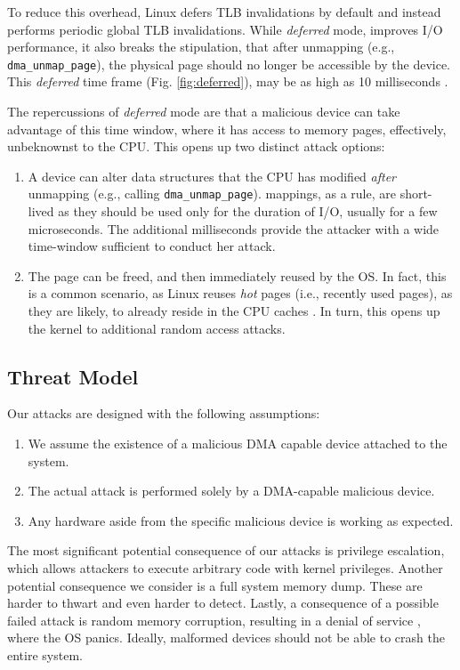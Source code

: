 To reduce this overhead, Linux defers TLB invalidations by default and instead performs periodic global TLB invalidations. While \emph{deferred} mode, improves I/O performance, it also breaks the stipulation, that after unmapping (e.g., \texttt{dma\_unmap\_page}), the physical page should no longer be accessible by the device. This \emph{deferred} time frame (Fig. \ref{fig:deferred}), may be as high as 10 milliseconds \cite{MSMT18}.

The repercussions of \emph{deferred} mode are that a malicious device can take advantage of this time window, where it has access to memory pages, effectively, unbeknownst to the CPU. This opens up two distinct attack options:

\begin{enumerate}
    \item A device can alter data structures that the CPU has modified \emph{after} unmapping (e.g., calling \texttt{dma\_unmap\_page}).
    \iova{} mappings, as a rule, are short-lived as they should be used only for the duration of I/O, usually for a few microseconds. The additional milliseconds provide the attacker with a wide time-window sufficient to conduct her attack.
    \item The page can be freed, and then immediately reused by the OS. In fact, this is a common scenario, as Linux reuses \emph{hot} pages (i.e., recently used pages), as they are likely, to already reside in the CPU caches \cite{hotcold}. In turn, this opens up the kernel to additional random access attacks.
\end{enumerate}

\subsection{Threat Model}\label{sec:threat_model}

Our attacks are designed with the following assumptions:
\begin{enumerate}
    \item We assume the existence of a malicious DMA capable device attached to the system.
    \item The actual attack is performed solely by a DMA-capable malicious device.
    \item Any hardware aside from the specific malicious device is working as expected.
 \end{enumerate}

The most significant potential consequence of our attacks is privilege escalation, which allows attackers to execute arbitrary code with kernel privileges. Another potential consequence we consider is a full system memory dump. These are harder to thwart and even harder to detect. Lastly, a consequence of a possible failed attack is random memory corruption, resulting in a denial of service \cite{MMT16}, where the OS panics. Ideally, malformed devices should not be able to crash the entire system. 
